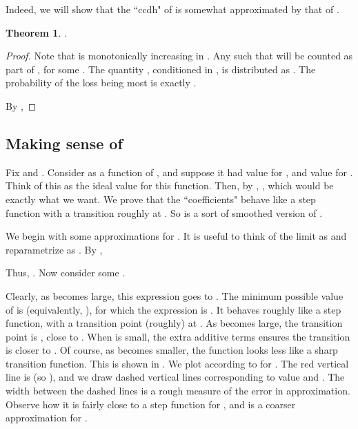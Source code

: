 \documentclass[11pt]{article}
\newtheorem{theorem}{Theorem}
\theoremstyle{definition}
\begin{document}
Indeed, we will show that the ``ccdh" of
 is somewhat approximated by that of .

\begin{theorem} \label{thm:tc} .
\end{theorem}

\begin{proof} Note that  is monotonically increasing in .
Any  such that  will be counted as part of , for some
. The quantity , conditioned in , is distributed as .
The probability of the loss being most  is exactly .

By , 
\end{proof}

\subsection{Making sense of } \label{sec:tc}

Fix  and .
Consider  as a function of , and suppose it had value  for , and value  for .
Think of this as the ideal value for this function.
Then, by , , which
would be exactly what we want. We prove that the ``coefficients" 
behave like a step function with a transition roughly at . So 
is a sort of smoothed version of .

We begin with some approximations for . It is useful
to think of the limit as 
and reparametrize as .
By ,


Thus, . Now consider some .




Clearly, as  becomes large, this expression goes to . The minimum possible
value of  is  (equivalently, ), for which
the expression is . It behaves roughly like a step function, with a transition point (roughly)
at . As  becomes large, the transition point is , close
to .
When  is small, the extra  additive terms
ensures the transition is closer to . Of course, as  becomes smaller, the function looks less
like a sharp transition function.
This is shown in . We plot  according to  for . The red vertical
line is  (so ), and we draw dashed vertical lines corresponding to value  and .
The width between the dashed lines is a rough measure of the error in approximation.
Observe how it is fairly close to a step function for , and is a coarser approximation for .
\end{document}
